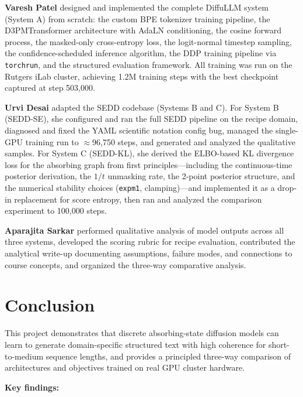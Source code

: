 \documentclass[11pt,a4paper]{article}
\begin{document}
\textbf{Varesh Patel} designed and implemented the complete DiffuLLM system (System A) from scratch: the custom BPE tokenizer training pipeline, the D3PMTransformer architecture with AdaLN conditioning, the cosine forward process, the masked-only cross-entropy loss, the logit-normal timestep sampling, the confidence-scheduled inference algorithm, the DDP training pipeline via \texttt{torchrun}, and the structured evaluation framework. All training was run on the Rutgers iLab cluster, achieving 1.2M training steps with the best checkpoint captured at step 503,000.

\textbf{Urvi Desai} adapted the SEDD codebase (Systems B and C). For System B (SEDD-SE), she configured and ran the full SEDD pipeline on the recipe domain, diagnosed and fixed the YAML scientific notation config bug, managed the single-GPU training run to $\approx$96,750 steps, and generated and analyzed the qualitative samples. For System C (SEDD-KL), she derived the ELBO-based KL divergence loss for the absorbing graph from first principles---including the continuous-time posterior derivation, the $1/t$ unmasking rate, the 2-point posterior structure, and the numerical stability choices (\texttt{expm1}, clamping)---and implemented it as a drop-in replacement for score entropy, then ran and analyzed the comparison experiment to 100,000 steps.

\textbf{Aparajita Sarkar} performed qualitative analysis of model outputs across all three systems, developed the scoring rubric for recipe evaluation, contributed the analytical write-up documenting assumptions, failure modes, and connections to course concepts, and organized the three-way comparative analysis.

\section{Conclusion}

This project demonstrates that discrete absorbing-state diffusion models can learn to generate domain-specific structured text with high coherence for short-to-medium sequence lengths, and provides a principled three-way comparison of architectures and objectives trained on real GPU cluster hardware.

\textbf{Key findings:}
\end{document}
